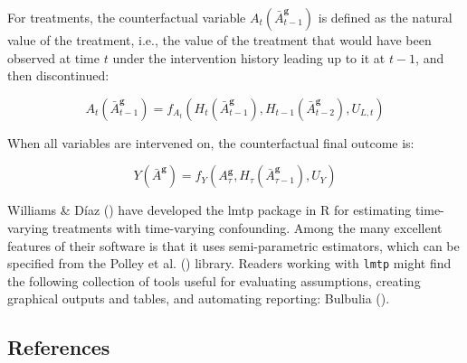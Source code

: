 \documentclass[
  single column]{article}
\begin{document}
For treatments, the counterfactual variable
\(A_t(\bar{A}^\mathbf{g}_{t-1})\) is defined as the natural value of the
treatment, i.e., the value of the treatment that would have been
observed at time \(t\) under the intervention history leading up to it
at \(t-1\), and then discontinued:

\[
A_t(\bar{A}^\mathbf{g}_{t-1}) = f_{A_t}(H_t(\bar{A}^\mathbf{g}_{t-1}), H_{t-1}(\bar{A}^\mathbf{g}_{t-2}), U_{L,t})
\]

When all variables are intervened on, the counterfactual final outcome
is:

\[
Y(\bar{A}^\mathbf{g}) = f_Y(A^\mathbf{g}_\tau, H_\tau(\bar{A}^\mathbf{g}_{\tau-1}), U_{Y})
\]

Williams \& Díaz () have developed the
lmtp package in R for estimating time-varying treatments with
time-varying confounding. Among the many excellent features of their
software is that it uses semi-parametric estimators, which can be
specified from the Polley et al. ()
library. Readers working with \texttt{lmtp} might find the following
collection of tools useful for evaluating assumptions, creating
graphical outputs and tables, and automating reporting: Bulbulia
().

\newpage{}

\subsection{References}\label{references}
\end{document}
